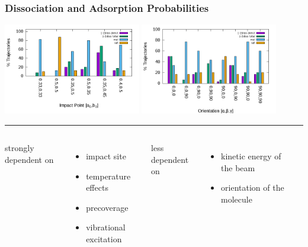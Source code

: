 \documentclass[hyperref={pdfpagelabels=false}]{beamer}
\begin{document}
\begin{frame}
 \frametitle{Dissociation and Adsorption Probabilities}
 \includegraphics[width=0.45\textwidth]{figures/impactpoint.png}
\includegraphics[width=0.45\textwidth]{figures/orientation.png}\hrule\pause
 \begin{columns}
  strongly dependent on
  \begin{itemize}
   \item impact site
   \item temperature effects
   \item precoverage
   \item vibrational excitation
  \end{itemize}
  \newline less dependent on
  \begin{itemize}
   \item kinetic energy of the beam
   \item orientation of the molecule
  \end{itemize}
  \newline~\newline
  \clearpage
 \end{columns}
\\ 
\end{frame}
\end{document}
